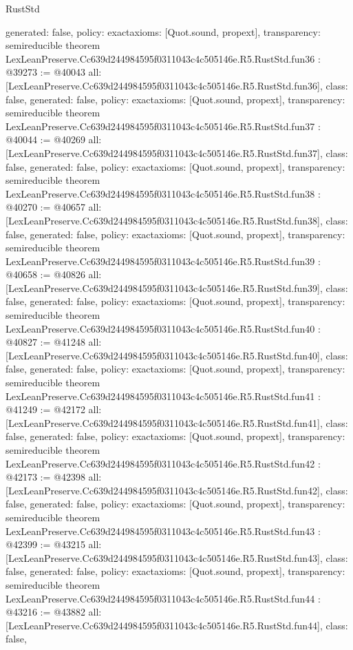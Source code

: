 \begin{lexlean}{RustStd}
\begin{coremodule}
{  generated: false,
  policy: exact{axioms: [Quot.sound, propext]},
  transparency: semireducible
}
theorem LexLeanPreserve.Cc639d244984595f0311043c4c505146e.R5.RustStd.fun36 : @39273 := @40043 {
  all: [LexLeanPreserve.Cc639d244984595f0311043c4c505146e.R5.RustStd.fun36],
  class: false,
  generated: false,
  policy: exact{axioms: [Quot.sound, propext]},
  transparency: semireducible
}
theorem LexLeanPreserve.Cc639d244984595f0311043c4c505146e.R5.RustStd.fun37 : @40044 := @40269 {
  all: [LexLeanPreserve.Cc639d244984595f0311043c4c505146e.R5.RustStd.fun37],
  class: false,
  generated: false,
  policy: exact{axioms: [Quot.sound, propext]},
  transparency: semireducible
}
theorem LexLeanPreserve.Cc639d244984595f0311043c4c505146e.R5.RustStd.fun38 : @40270 := @40657 {
  all: [LexLeanPreserve.Cc639d244984595f0311043c4c505146e.R5.RustStd.fun38],
  class: false,
  generated: false,
  policy: exact{axioms: [Quot.sound, propext]},
  transparency: semireducible
}
theorem LexLeanPreserve.Cc639d244984595f0311043c4c505146e.R5.RustStd.fun39 : @40658 := @40826 {
  all: [LexLeanPreserve.Cc639d244984595f0311043c4c505146e.R5.RustStd.fun39],
  class: false,
  generated: false,
  policy: exact{axioms: [Quot.sound, propext]},
  transparency: semireducible
}
theorem LexLeanPreserve.Cc639d244984595f0311043c4c505146e.R5.RustStd.fun40 : @40827 := @41248 {
  all: [LexLeanPreserve.Cc639d244984595f0311043c4c505146e.R5.RustStd.fun40],
  class: false,
  generated: false,
  policy: exact{axioms: [Quot.sound, propext]},
  transparency: semireducible
}
theorem LexLeanPreserve.Cc639d244984595f0311043c4c505146e.R5.RustStd.fun41 : @41249 := @42172 {
  all: [LexLeanPreserve.Cc639d244984595f0311043c4c505146e.R5.RustStd.fun41],
  class: false,
  generated: false,
  policy: exact{axioms: [Quot.sound, propext]},
  transparency: semireducible
}
theorem LexLeanPreserve.Cc639d244984595f0311043c4c505146e.R5.RustStd.fun42 : @42173 := @42398 {
  all: [LexLeanPreserve.Cc639d244984595f0311043c4c505146e.R5.RustStd.fun42],
  class: false,
  generated: false,
  policy: exact{axioms: [Quot.sound, propext]},
  transparency: semireducible
}
theorem LexLeanPreserve.Cc639d244984595f0311043c4c505146e.R5.RustStd.fun43 : @42399 := @43215 {
  all: [LexLeanPreserve.Cc639d244984595f0311043c4c505146e.R5.RustStd.fun43],
  class: false,
  generated: false,
  policy: exact{axioms: [Quot.sound, propext]},
  transparency: semireducible
}
theorem LexLeanPreserve.Cc639d244984595f0311043c4c505146e.R5.RustStd.fun44 : @43216 := @43882 {
  all: [LexLeanPreserve.Cc639d244984595f0311043c4c505146e.R5.RustStd.fun44],
  class: false,
}
\end{coremodule}
\end{lexlean}
